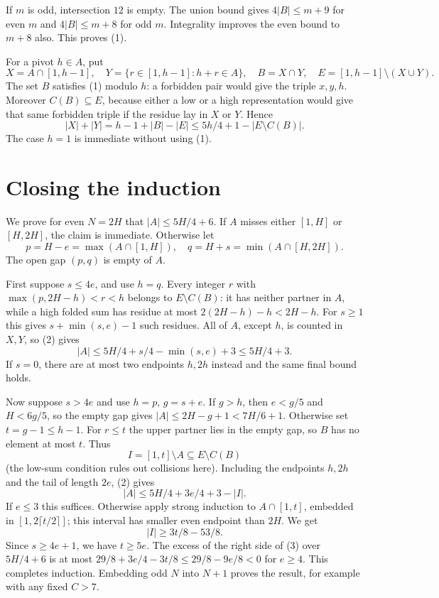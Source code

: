\documentclass[11pt]{article}
\begin{document}
If $m$ is odd, intersection $12$ is empty. The union bound gives $4|B|\le m+9$ for even $m$ and $4|B|\le m+8$ for odd $m$. Integrality improves the even bound to $m+8$ also. This proves (1).

For a pivot $h\in A$, put
\[
 X=A\cap[1,h-1],\quad Y=\{r\in[1,h-1]:h+r\in A\},\quad B=X\cap Y,
 \quad E=[1,h-1]\setminus(X\cup Y).
\]
The set $B$ satisfies (1) modulo $h$: a forbidden pair would give the triple $x,y,h$. Moreover $C(B)\subseteq E$, because either a low or a high representation would give that same forbidden triple if the residue lay in $X$ or $Y$. Hence
\[
 |X|+|Y|=h-1+|B|-|E|\le5h/4+1-|E\setminus C(B)|.\tag{2}
\]
The case $h=1$ is immediate without using (1).

\section*{Closing the induction}
We prove for even $N=2H$ that $|A|\le5H/4+6$. If $A$ misses either $[1,H]$ or $[H,2H]$, the claim is immediate. Otherwise let
\[
 p=H-e=\max(A\cap[1,H]),\quad q=H+s=\min(A\cap[H,2H]).
\]
The open gap $(p,q)$ is empty of $A$.

First suppose $s\le4e$, and use $h=q$. Every integer $r$ with $\max(p,2H-h)<r<h$ belongs to $E\setminus C(B)$: it has neither partner in $A$, while a high folded sum has residue at most $2(2H-h)-h<2H-h$. For $s\ge1$ this gives $s+\min(s,e)-1$ such residues. All of $A$, except $h$, is counted in $X,Y$, so (2) gives
\[
 |A|\le5H/4+s/4-\min(s,e)+3\le5H/4+3.
\]
If $s=0$, there are at most two endpoints $h,2h$ instead and the same final bound holds.

Now suppose $s>4e$ and use $h=p$, $g=s+e$. If $g>h$, then $e<g/5$ and $H<6g/5$, so the empty gap gives $|A|\le2H-g+1<7H/6+1$. Otherwise set $t=g-1\le h-1$. For $r\le t$ the upper partner lies in the empty gap, so $B$ has no element at most $t$. Thus
\[
 I=[1,t]\setminus A\subseteq E\setminus C(B)
\]
(the low-sum condition rules out collisions here). Including the endpoints $h,2h$ and the tail of length $2e$, (2) gives
\[
 |A|\le5H/4+3e/4+3-|I|.\tag{3}
\]
If $e\le3$ this suffices. Otherwise apply strong induction to $A\cap[1,t]$, embedded in $[1,2\lceil t/2\rceil]$; this interval has smaller even endpoint than $2H$. We get
\[
 |I|\ge3t/8-53/8.
\]
Since $s\ge4e+1$, we have $t\ge5e$. The excess of the right side of (3) over $5H/4+6$ is at most $29/8+3e/4-3t/8\le29/8-9e/8<0$ for $e\ge4$. This completes induction. Embedding odd $N$ into $N+1$ proves the result, for example with any fixed $C>7$.
\end{document}
